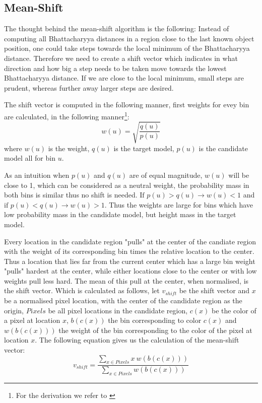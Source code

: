 \documentclass[a4paper,11pt]{article}
\begin{document}
\subsection{Mean-Shift}

The thought behind the mean-shift algorithm is the following: Instead of computing all Bhattacharyya distances in a region close to the last known object position, one could take steps towards the local minimum of the Bhattacharyya distance. Therefore we need to create a shift vector which indicates in what direction and how big a step needs to be taken move towards the lowest Bhattacharyya distance. If we are close to the local minimum, small steps are prudent, whereas further away larger steps are desired. 

The shift vector is computed in the following manner, first weights for evey bin are calculated, in the following manner\footnote{For the derivation we refer to \cite{mean_shift}\label{fn:derivation_refer}}:
\begin{equation}
\label{eq:weights}
w(u) = \sqrt{\frac{q(u)}{p(u)}}
\end{equation} %
where $w(u)$ is the weight, $q(u)$ is the target model, $p(u)$ is the candidate model all for bin $u$.

As an intuition when $p(u)$ and $q(u)$ are of equal magnitude, $w(u)$ will be close to 1, which can be considered as a neutral weight, the probability mass in both bins is similar thus no shift is needed. $\textrm{If }p(u) > q(u) \rightarrow w(u) < 1$ and $\textrm{if }p(u) < q(u) \rightarrow w(u) > 1$. Thus the weights are large for bins  which have low probability mass in the candidate model, but height mass in the target model. 

Every location in the candidate region "pulls" at the center of the candiate region with the weight of its corresponding bin times the relative location to the center. Thus a location that lies far from the current center which has a large bin weight "pulls" hardest at the center, while either locations close to the center or with low weights pull less hard. The mean of this pull at the center, when normalised, is the shift vector. Which is calculated as follows, let $v_{shift}$ be the shift vector and $x$ be a normalised pixel location, with the center of the candidate region as the origin, $Pixels$ be all pixel locations in the candidate region, $c(x)$ be the color of a pixel at location $x$, $b(c(x))$ the bin corresponding to color $c(x)$ and $w(b(c(x)))$ the weight of the bin corresponding to the color of the pixel at location $x$. The following equation gives us the calculation of the mean-shift vector:
\begin{equation}
\label{eq:shift vector}
v_{shift}=\frac{\sum_{x\in Pixels} x \ w(b(c(x)))}{\sum_{x\in Pixels} w(b(c(x)))}
\end{equation} %
\end{document}
